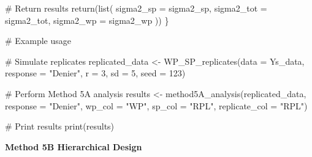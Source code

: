 \documentclass[
  letterpaper,
  DIV=11,
  numbers=noendperiod]{scrartcl}
\newenvironment{Shaded}{\begin{snugshade}}{\end{snugshade}}
\newcommand{\AttributeTok}[1]{\textcolor[rgb]{0.40,0.45,0.13}{#1}}
\newcommand{\CommentTok}[1]{\textcolor[rgb]{0.37,0.37,0.37}{#1}}
\newcommand{\DecValTok}[1]{\textcolor[rgb]{0.68,0.00,0.00}{#1}}
\newcommand{\FunctionTok}[1]{\textcolor[rgb]{0.28,0.35,0.67}{#1}}
\newcommand{\NormalTok}[1]{\textcolor[rgb]{0.00,0.23,0.31}{#1}}
\newcommand{\OtherTok}[1]{\textcolor[rgb]{0.00,0.23,0.31}{#1}}
\newcommand{\StringTok}[1]{\textcolor[rgb]{0.13,0.47,0.30}{#1}}
\begin{document}
\begin{Shaded}
\begin{Highlighting}[]
  \CommentTok{\# Return results}
  \FunctionTok{return}\NormalTok{(}\FunctionTok{list}\NormalTok{(}
    \AttributeTok{sigma2\_sp =}\NormalTok{ sigma2\_sp,}
    \AttributeTok{sigma2\_tot =}\NormalTok{ sigma2\_tot,}
    \AttributeTok{sigma2\_wp =}\NormalTok{ sigma2\_wp}
\NormalTok{  ))}
\NormalTok{\}}

\CommentTok{\# Example usage}


\CommentTok{\# Simulate replicates}
\NormalTok{replicated\_data }\OtherTok{\textless{}{-}} \FunctionTok{WP\_SP\_replicates}\NormalTok{(}\AttributeTok{data =}\NormalTok{ Ys\_data, }\AttributeTok{response =} \StringTok{"Denier"}\NormalTok{, }\AttributeTok{r =} \DecValTok{3}\NormalTok{, }\AttributeTok{sd =} \DecValTok{5}\NormalTok{, }\AttributeTok{seed =} \DecValTok{123}\NormalTok{)}

\CommentTok{\# Perform Method 5A analysis}
\NormalTok{results }\OtherTok{\textless{}{-}} \FunctionTok{method5A\_analysis}\NormalTok{(replicated\_data, }\AttributeTok{response =} \StringTok{"Denier"}\NormalTok{, }\AttributeTok{wp\_col =} \StringTok{"WP"}\NormalTok{, }\AttributeTok{sp\_col =} \StringTok{"RPL"}\NormalTok{, }\AttributeTok{replicate\_col =} \StringTok{"RPL"}\NormalTok{)}

\CommentTok{\# Print results}
\FunctionTok{print}\NormalTok{(results)}
\end{Highlighting}
\end{Shaded}

\textbf{Method 5B Hierarchical Design}
\end{document}

